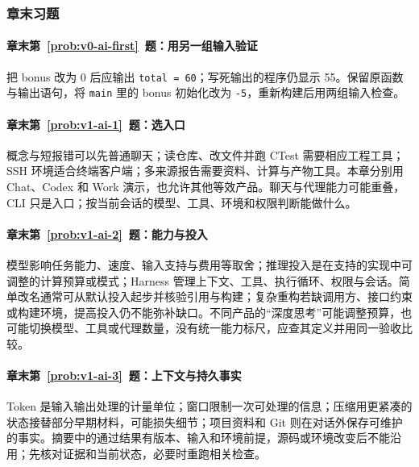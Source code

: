 \subsubsection*{章末习题}

\paragraph*{章末第~\ref{prob:v0-ai-first}~题：用另一组输入验证}
\begin{solution}
把 bonus 改为 0 后应输出 \texttt{total = 60}；写死输出的程序仍显示 55。保留原函数与输出语句，将 \texttt{main} 里的 bonus 初始化改为 \texttt{-5}，重新构建后用两组输入检查。
\end{solution}

\paragraph*{章末第~\ref{prob:v1-ai-1}~题：选入口}
\begin{solution}
概念与短报错可以先普通聊天；读仓库、改文件并跑 CTest 需要相应工程工具；SSH 环境适合终端客户端；多来源报告需要资料、计算与产物工具。本章分别用 Chat、Codex 和 Work 演示，也允许其他等效产品。聊天与代理能力可能重叠，CLI 只是入口；按当前会话的模型、工具、环境和权限判断能做什么。
\end{solution}

\paragraph*{章末第~\ref{prob:v1-ai-2}~题：能力与投入}
\begin{solution}
模型影响任务能力、速度、输入支持与费用等取舍；推理投入是在支持的实现中可调整的计算预算或模式；Harness 管理上下文、工具、执行循环、权限与会话。简单改名通常可从默认投入起步并核验引用与构建；复杂重构若缺调用方、接口约束或构建环境，提高投入仍不能弥补缺口。不同产品的“深度思考”可能调整预算，也可能切换模型、工具或代理数量，没有统一能力标尺，应查其定义并用同一验收比较。
\end{solution}

\paragraph*{章末第~\ref{prob:v1-ai-3}~题：上下文与持久事实}
\begin{solution}
Token 是输入输出处理的计量单位；窗口限制一次可处理的信息；压缩用更紧凑的状态接替部分早期材料，可能损失细节；项目资料和 Git 则在对话外保存可维护的事实。摘要中的通过结果有版本、输入和环境前提，源码或环境改变后不能沿用；先核对证据和当前状态，必要时重跑相关检查。
\end{solution}

